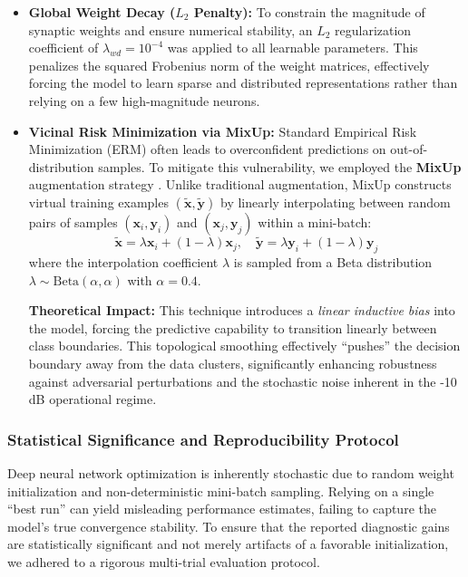 \documentclass[5p,times,twocolumn]{elsarticle}
\begin{document}
\begin{itemize}
    \item \textbf{Global Weight Decay ($L_2$ Penalty):} 
    To constrain the magnitude of synaptic weights and ensure numerical stability, an $L_2$ regularization coefficient of $\lambda_{wd} = 10^{-4}$ was applied to all learnable parameters. This penalizes the squared Frobenius norm of the weight matrices, effectively forcing the model to learn sparse and distributed representations rather than relying on a few high-magnitude neurons.

    \item \textbf{Vicinal Risk Minimization via MixUp:} 
    Standard Empirical Risk Minimization (ERM) often leads to overconfident predictions on out-of-distribution samples. To mitigate this vulnerability, we employed the \textbf{MixUp} augmentation strategy \cite{zhang2017mixup}. Unlike traditional augmentation, MixUp constructs virtual training examples $(\tilde{\mathbf{x}}, \tilde{\mathbf{y}})$ by linearly interpolating between random pairs of samples $(\mathbf{x}_i, \mathbf{y}_i)$ and $(\mathbf{x}_j, \mathbf{y}_j)$ within a mini-batch:
    \begin{equation}
        \tilde{\mathbf{x}} = \lambda \mathbf{x}_i + (1-\lambda)\mathbf{x}_j, \quad \tilde{\mathbf{y}} = \lambda \mathbf{y}_i + (1-\lambda)\mathbf{y}_j
    \end{equation}
    where the interpolation coefficient $\lambda$ is sampled from a Beta distribution $\lambda \sim \text{Beta}(\alpha, \alpha)$ with $\alpha=0.4$. 
    
    \textbf{Theoretical Impact:} This technique introduces a \textit{linear inductive bias} into the model, forcing the predictive capability to transition linearly between class boundaries. This topological smoothing effectively ``pushes'' the decision boundary away from the data clusters, significantly enhancing robustness against adversarial perturbations and the stochastic noise inherent in the -10 dB operational regime.
\end{itemize}

\subsubsection{Statistical Significance and Reproducibility Protocol}
Deep neural network optimization is inherently stochastic due to random weight initialization and non-deterministic mini-batch sampling. Relying on a single ``best run'' can yield misleading performance estimates, failing to capture the model's true convergence stability. To ensure that the reported diagnostic gains are statistically significant and not merely artifacts of a favorable initialization, we adhered to a rigorous multi-trial evaluation protocol.
\end{document}
